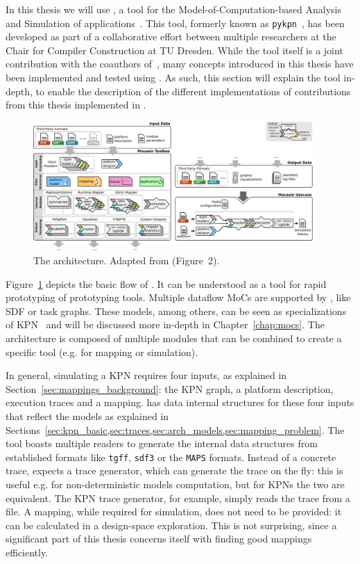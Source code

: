 In this thesis we will use \mocasin, a tool for the Model-of-Computation-based Analysis and Simulation of applications~\cite{menard_rapido21}.
This tool, formerly known as \texttt{pykpn}~\cite{menard_norcas16,goens_mcsoc18}, has been developed as part of a collaborative effort between multiple researchers at the Chair for Compiler Construction at TU Dresden.
While the tool itself is a joint contribution with the coauthors of~\cite{menard_rapido21}, many concepts introduced in this thesis have been implemented and tested using \mocasin.
As such, this section will explain the tool in-depth, to enable the description of the different implementations of contributions from this thesis implemented in \mocasin.

\begin{figure}[h]
	\centering
   \includegraphics[width=0.95\textwidth]{figures/mocasin.pdf}
	\caption{The \mocasin architecture. Adapted from \cite{menard_rapido21} (Figure~2).}
	\label{fig:mocasin_arch}
\end{figure}


Figure~\ref{fig:mocasin_arch} depicts the basic flow of \mocasin.
It can be understood as a tool for rapid prototyping of prototyping tools.
Multiple dataflow \acp{MoC} are supported by \mocasin, like \ac{SDF} or task graphs.
These models, among others, can be seen as specializations of \ac{KPN}~\cite{lee1995dataflow} and will be discussed more in-depth in Chapter~\ref{chap:mocs}.
The \mocasin architecture is composed of multiple modules that can be combined to create a specific tool (e.g. for mapping or simulation). 

In general, simulating a KPN requires four inputs, as explained in Section~\ref{sec:mappings_background}: the KPN graph, a platform description, execution traces and a mapping.
\mocasin has data internal structures for these four inputs that reflect the models as explained in Sections~\ref{sec:kpn_basic,sec:traces,sec:arch_models,sec:mapping_problem}.
The tool boasts multiple readers to generate the internal data structures from established formats like \texttt{tgff}, \texttt{sdf3} or the \texttt{MAPS} formats. \index{\acs*{\SDFFF}}
Instead of a concrete trace, \mocasin expects a trace generator, which can generate the trace on the fly: this is useful e.g. for non-deterministic models computation, but for KPNs the two are equivalent.
The \ac{KPN} trace generator, for example, simply reads the trace from a file.
A mapping, while required for simulation, does not need to be provided: it can be calculated in a design-space exploration.
This is not surprising, since a significant part of this thesis concerns itself with finding good mappings efficiently.

